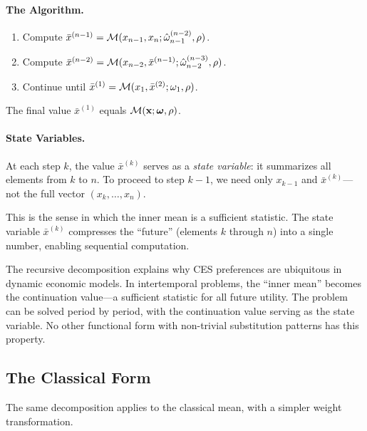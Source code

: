 \paragraph{The Algorithm.}
\begin{enumerate}[label=\textbf{Step \arabic*:}, leftmargin=3em]
    \item Compute $\bar{x}^{(n-1)} = \mathcal{M}(x_{n-1}, x_n; \hat{\omega}_{n-1}^{(n-2)}, \rho)$.
    \item Compute $\bar{x}^{(n-2)} = \mathcal{M}(x_{n-2}, \bar{x}^{(n-1)}; \hat{\omega}_{n-2}^{(n-3)}, \rho)$.
    \item Continue until $\bar{x}^{(1)} = \mathcal{M}(x_1, \bar{x}^{(2)}; \omega_1, \rho)$.
\end{enumerate}
The final value $\bar{x}^{(1)}$ equals $\mathcal{M}(\mathbf{x}; \boldsymbol{\omega}, \rho)$.

\paragraph{State Variables.}
At each step $k$, the value $\bar{x}^{(k)}$ serves as a \emph{state variable}: it summarizes all elements from $k$ to $n$. To proceed to step $k-1$, we need only $x_{k-1}$ and $\bar{x}^{(k)}$---not the full vector $(x_k, \ldots, x_n)$.

This is the sense in which the inner mean is a sufficient statistic. The state variable $\bar{x}^{(k)}$ compresses the ``future'' (elements $k$ through $n$) into a single number, enabling sequential computation.

\begin{calloutimportant}
The recursive decomposition explains why CES preferences are ubiquitous in dynamic economic models. In intertemporal problems, the ``inner mean'' becomes the continuation value---a sufficient statistic for all future utility. The problem can be solved period by period, with the continuation value serving as the state variable. No other functional form with non-trivial substitution patterns has this property.
\end{calloutimportant}

\subsection{The Classical Form}
\label{subsec:classical-recursion}

The same decomposition applies to the classical mean, with a simpler weight transformation.

